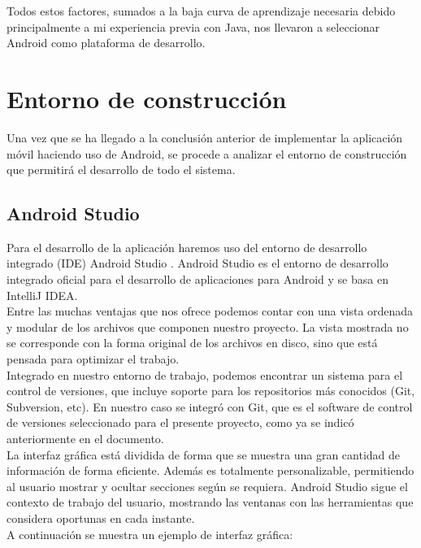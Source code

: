 Todos estos factores, sumados a la baja curva de aprendizaje necesaria debido principalmente a mi experiencia previa con Java, nos llevaron a seleccionar Android como plataforma de desarrollo.

\section{Entorno de construcción}

Una vez que se ha llegado a la conclusión anterior de implementar la aplicación móvil haciendo uso de Android, se procede a analizar el entorno de construcción que permitirá el desarrollo de todo el sistema.

\subsection{Android Studio}

Para el desarrollo de la aplicación haremos uso del entorno de desarrollo integrado (IDE) Android Studio \cite{website:androidstudio}. Android Studio es el entorno de desarrollo integrado oficial para el desarrollo de aplicaciones para Android y se basa en IntelliJ IDEA.\\

Entre las muchas ventajas que nos ofrece podemos contar con una vista ordenada y modular de los archivos que componen nuestro proyecto. La vista mostrada no se corresponde con la forma original de los archivos en disco, sino que está pensada para optimizar el trabajo.\\

Integrado en nuestro entorno de trabajo, podemos encontrar un sistema para el control de versiones, que incluye soporte para los repositorios más conocidos (Git, Subversion, etc). En nuestro caso se integró con Git, que es el software de control de versiones seleccionado para el presente proyecto, como ya se indicó anteriormente en el documento.\\

La interfaz gráfica está dividida de forma que se muestra una gran cantidad de información de forma eficiente. Además es totalmente personalizable, permitiendo al usuario mostrar y ocultar secciones según se requiera. Android Studio sigue el contexto de trabajo del usuario, mostrando las ventanas con las herramientas que considera oportunas en cada instante.\\

A continuación se muestra un ejemplo de interfaz gráfica:

